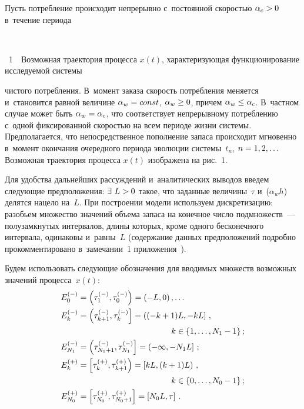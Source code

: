 \begin{multicols}{2}
  Пусть потребление происходит непрерывно с~постоянной скоростью 
$\alpha_c\hm>0$ в~течение периода\linebreak\vspace*{-12pt}

 { \begin{center}  %
 \vspace*{-1pt}
  \mbox{%
 \epsfxsize=77.535mm 
 }


\end{center}


\noindent
{{\figurename~1}\ \ \small{Возможная траектория процесса $x(t)$, характеризующая функционирование 
исследуемой системы}}
}

\vspace*{9pt}


 
\noindent
 чистого потребления. В~момент заказа 
скорость потребления меняется и~становится равной величине 
$\alpha_w\hm=const$, $\alpha_w\hm\geq 0$, причем $\alpha_w\hm\leq \alpha_c$. 
В~частном случае может быть $\alpha_w\hm=\alpha_c$, что соответствует 
непрерывному потреблению с~одной фиксированной скоростью на всем 
периоде жизни системы. Предполагается, что непосредственное пополнение 
запаса происходит мгновенно в~момент окончания очередного периода 
эволюции системы~$t_n$, $n\hm=1,2,\ldots$ Возможная траектория процесса 
$x(t)$ изображена на рис.~1.
  

  
  Для удобства дальнейших рассуждений и~аналитических выводов введем 
следующие предположения: $\exists\ L\hm>0$ такое, что заданные 
величины~$\tau$ и~($\alpha_w h$) делятся нацело на~$L$. При построении 
модели используем дискретизацию: разобьем множество значений объема 
запаса на конечное число подмножеств~--- полузамкнутых интервалов, длины 
которых, кроме одного бесконечного интервала, одинаковы и~равны~$L$ 
(содержание данных предположений подробно прокомментировано 
в~замечании~1 приложения~\cite{1-sh}).
  
  Будем использовать следующие обозначения для вводимых множеств 
возможных значений процесса~$x(t)$:
  \begin{align*}
E_0^{(-)} &= \left(\tau_1^{(-)},\tau_0^{(-)}\right)= (-L,0)\,,\ldots\\
E_k^{(-)} &= \left( \tau_{k+1}^{(-)}, \tau_k^{(-)} \right] = 
\left( (-k+1)L, -kL\right]\,,\\
& \hspace*{40mm}k\in \{1,\ldots, N_1-1\}\,;\\
E_{N_1}^{(-)} &= \left( \tau^{(-)}_{N_1+1},\tau_{N_1}^{(-)}\right] =\left( -
\infty, -N_1L\right]\,;\\
E_k^{(+)} &= \left[ \tau_k^{(+)},\tau^{(+)}_{k+1}\right) = \left[ kL, 
(k+1)L\right)\,,\\
&\hspace*{40mm} k\in \{0,\ldots ,N_0-1\}\,;\\
E^{(+)}_{N_0} &= \left[ \tau^{(+)}_{N_0}, \tau^{(+)}_{N_0+1}\right] = \left[ N_0 
L, \tau\right]\,.
\end{align*}
  

\end{multicols}
